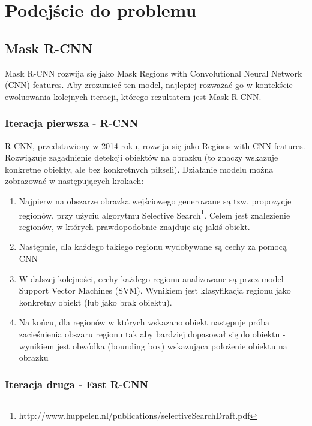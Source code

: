 \chapter{Podejście do problemu}



\section{Mask R-CNN}

Mask R-CNN rozwija się jako Mask Regions with Convolutional Neural Network (CNN) features. Aby zrozumieć ten model, najlepiej rozważać go w kontekście ewoluowania kolejnych iteracji, którego rezultatem jest Mask R-CNN.

\subsection{Iteracja pierwsza - R-CNN}

R-CNN, przedstawiony w 2014 roku, rozwija się jako Regions with CNN features. Rozwiązuje zagadnienie detekcji obiektów na obrazku (to znaczy wskazuje konkretne obiekty, ale bez konkretnych pikseli). Działanie modelu można zobrazować w następujących krokach:

\begin{enumerate}
	\item Najpierw na obszarze obrazka wejściowego generowane są tzw. propozycje regionów, przy użyciu algorytmu Selective Search\footnote{http://www.huppelen.nl/publications/selectiveSearchDraft.pdf}. Celem jest znalezienie regionów, w których prawdopodobnie znajduje się jakiś obiekt.
	\item Następnie, dla każdego takiego regionu wydobywane są cechy za pomocą CNN
	\item W dalszej kolejności, cechy każdego regionu analizowane są przez model Support Vector Machines (SVM). Wynikiem jest klasyfikacja regionu jako konkretny obiekt (lub jako brak obiektu).
	\item Na końcu, dla regionów w których wskazano obiekt następuje próba zacieśnienia obszaru regionu tak aby bardziej dopasował się do obiektu - wynikiem jest obwódka (bounding box) wskazująca położenie obiektu na obrazku
\end{enumerate}

\subsection{Iteracja druga - Fast R-CNN}

